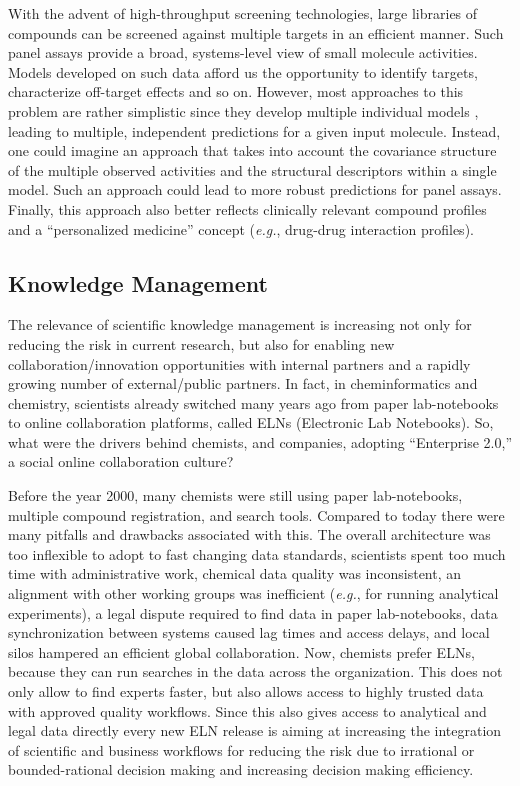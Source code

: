 \documentclass{sig-alternate}
\begin{document}
With the advent of high-throughput screening technologies, large
libraries of compounds can be screened against multiple targets in an
efficient manner. Such panel assays provide a broad, systems-level
view of small molecule activities.  Models developed on such data
afford us the opportunity to identify targets, characterize off-target
effects and so on. However, most approaches to this problem are rather
simplistic since they develop multiple individual models
\cite{Chen:2010zr}, leading to multiple, independent predictions for a
given input molecule.  Instead, one could imagine an approach that
takes into account the covariance structure of the multiple observed
activities and the structural descriptors within a single model. Such
an approach could lead to more robust predictions for panel
assays. Finally, this approach also better reflects clinically
relevant compound profiles~\cite{kuhn2010} and a ``personalized
medicine'' concept (\emph{e.g.}, drug-drug interaction profiles).

\subsection{Knowledge Management}
\label{sec:knowledge-management}

The relevance of scientific knowledge management is increasing not only for
reducing the risk in current research, but also for enabling new
collaboration/innovation opportunities with internal partners and a rapidly growing
number of external/public partners. In fact, in cheminformatics and chemistry,
scientists already switched many years ago from paper lab-notebooks to
online collaboration platforms, called ELNs (Electronic Lab Notebooks). So, what were the drivers behind chemists, and
companies, adopting ``Enterprise 2.0,'' a social online collaboration culture?

Before the year 2000, many chemists were still using paper
lab-notebooks, multiple compound registration, and search tools. Compared to
today there were many pitfalls and drawbacks associated with this. The overall architecture
was too inflexible to adopt to fast changing data standards, scientists spent
too much time with administrative work, chemical data quality was inconsistent,
an alignment with other working groups was inefficient (\emph{e.g.}, for running
analytical experiments), a legal dispute required to find data in paper
lab-notebooks, data synchronization between systems caused lag times and access
delays, and local silos hampered an efficient global collaboration. Now,
chemists prefer ELNs, because they can run searches in the data across the organization. This does
not only allow to find experts faster, but also allows access to highly trusted
data with approved quality workflows. Since this also gives access to
analytical and legal data directly every new ELN release is aiming at increasing
the integration of scientific and business workflows for reducing the risk due
to irrational or bounded-rational decision making and increasing decision making
efficiency.
\end{document}
